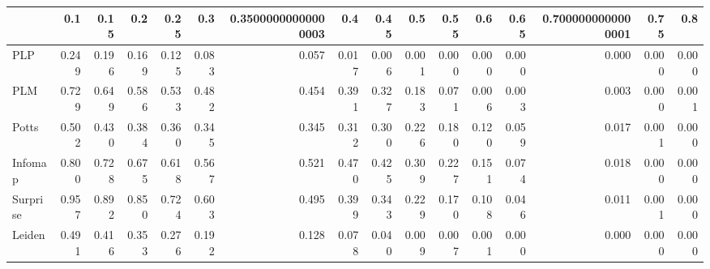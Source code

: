 \begin{tabular}{lrrrrrrrrrrrrrrr}
\toprule
{} &   0.1 &  0.15 &   0.2 &  0.25 &   0.3 & 0.35000000000000003 &   0.4 &  0.45 &   0.5 &  0.55 &   0.6 &  0.65 & 0.7000000000000001 &  0.75 &   0.8 \\
\midrule
PLP      & 0.249 & 0.196 & 0.169 & 0.125 & 0.083 &               0.057 & 0.017 & 0.006 & 0.001 & 0.000 & 0.000 & 0.000 &              0.000 & 0.000 & 0.000 \\
PLM      & 0.729 & 0.649 & 0.586 & 0.533 & 0.482 &               0.454 & 0.391 & 0.327 & 0.183 & 0.071 & 0.006 & 0.003 &              0.003 & 0.000 & 0.001 \\
Potts    & 0.502 & 0.430 & 0.384 & 0.360 & 0.345 &               0.345 & 0.312 & 0.300 & 0.226 & 0.180 & 0.120 & 0.059 &              0.017 & 0.001 & 0.000 \\
Infomap  & 0.800 & 0.728 & 0.675 & 0.618 & 0.567 &               0.521 & 0.470 & 0.425 & 0.309 & 0.227 & 0.151 & 0.074 &              0.018 & 0.000 & 0.000 \\
Surprise & 0.957 & 0.892 & 0.850 & 0.724 & 0.603 &               0.495 & 0.399 & 0.343 & 0.229 & 0.170 & 0.108 & 0.046 &              0.011 & 0.001 & 0.000 \\
Leiden   & 0.491 & 0.416 & 0.353 & 0.276 & 0.192 &               0.128 & 0.078 & 0.040 & 0.009 & 0.007 & 0.001 & 0.000 &              0.000 & 0.000 & 0.000 \\
\bottomrule
\end{tabular}
